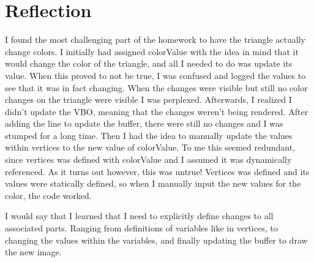 \section{Reflection}
\label{section:Reflection}

I found the most challenging part of the homework to have the triangle actually change colors.
I initially had assigned colorValue with the idea in mind that it would change the color of the triangle, and all I needed to do was update its value.
When this proved to not be true, I was confused and logged the values to see that it was in fact changing.
When the changes were visible but still no color changes on the triangle were visible I was perplexed.
Afterwards, I realized I didn't update the VBO, meaning that the changes weren't being rendered.
After adding the line to update the buffer, there were still no changes and I was stumped for a long time.
Then I had the idea to manually update the values within vertices to the new value of colorValue.
To me this seemed redundant, since vertices was defined with colorValue and I assumed it was dynamically referenced.
As it turns out however, this was untrue!
Vertices was defined and its values were statically defined, so when I manually input the new values for the color, the code worked.

I would say that I learned that I need to explicitly define changes to all associated parts.
Ranging from definitions of variables like in vertices, to changing the values within the variables, and finally updating the buffer to draw the new image.